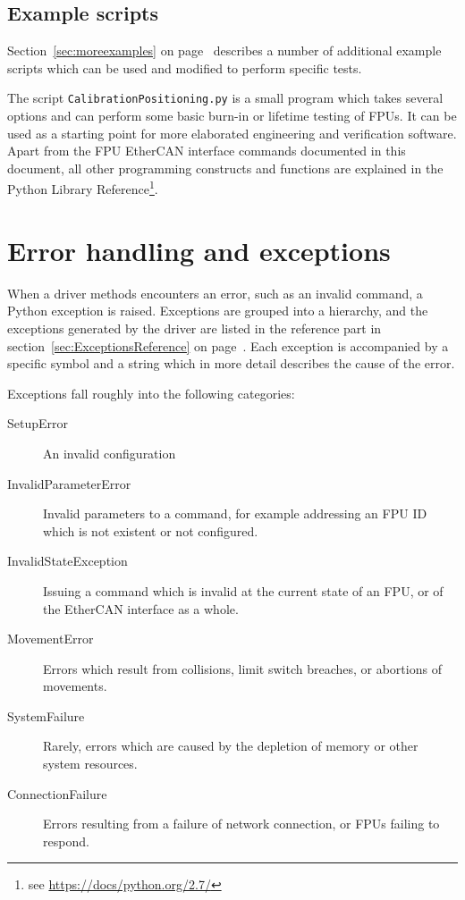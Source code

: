 \documentclass[11pt,a4paper]{report}
\begin{document}
\subsection{Example scripts}

Section~\ref{sec:moreexamples} on page~\pageref{sec:moreexamples}
describes a number of additional example scripts which can be used and
modified to perform specific tests.

The script \texttt{CalibrationPositioning.py} is a small program which
takes several options and can perform some basic burn-in or lifetime
testing of FPUs. It can be used as a starting point for more
elaborated engineering and verification software. Apart from the FPU
EtherCAN interface commands documented in this document, all other programming
constructs and functions are explained in the Python Library
Reference\footnote{see \url{https://docs/python.org/2.7/}}.


\section{Error handling and exceptions}
\label{sec:errorhandling}
When a driver methods encounters an error, such as an invalid command,
a Python exception is raised. Exceptions are grouped into a hierarchy,
and the exceptions generated by the driver are listed in the reference
part in section~\ref{sec:ExceptionsReference} on
page~\pageref{sec:ExceptionsReference}. Each exception is accompanied
by a specific symbol and a string which in more detail describes the
cause of the error.

Exceptions fall roughly into the following categories:

\begin{description}
  \item[SetupError] An invalid configuration 
  \item[InvalidParameterError] Invalid parameters to a command, for example addressing an FPU
    ID which is not existent or not configured.
  \item[InvalidStateException] Issuing a command which is invalid at the current state of
    an FPU, or of the EtherCAN interface as a whole.
  \item[MovementError] Errors which result from collisions, limit switch breaches,
    or abortions of movements.
  \item[SystemFailure] Rarely, errors which are caused by the depletion of memory
    or other system resources.
  \item[ConnectionFailure] Errors resulting from a failure of network connection, or FPUs failing to respond.
\end{description}
\end{document}
